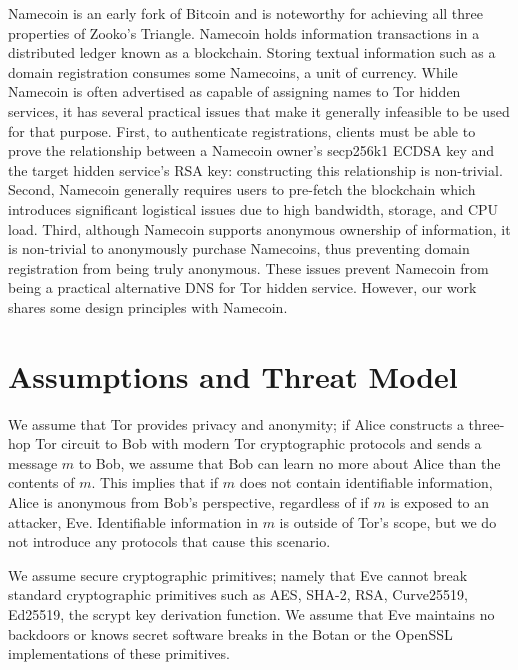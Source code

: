 \documentclass{sig-alternate}
\begin{document}
Namecoin\cite{NamecoinHome} is an early fork of Bitcoin\cite{nakamoto2008bitcoin} and is noteworthy for achieving all three properties of Zooko's Triangle. Namecoin holds information transactions in a distributed ledger known as a blockchain. Storing textual information such as a domain registration consumes some Namecoins, a unit of currency. While Namecoin is often advertised as capable of assigning names to Tor hidden services, it has several practical issues that make it generally infeasible to be used for that purpose. First, to authenticate registrations, clients must be able to prove the relationship between a Namecoin owner's secp256k1 ECDSA key and the target hidden service's RSA key: constructing this relationship is non-trivial. Second, Namecoin generally requires users to pre-fetch the blockchain which introduces significant logistical issues due to high bandwidth, storage, and CPU load. Third, although Namecoin supports anonymous ownership of information, it is non-trivial to anonymously purchase Namecoins, thus preventing domain registration from being truly anonymous. These issues prevent Namecoin from being a practical alternative DNS for Tor hidden service. However, our work shares some design principles with Namecoin.

\section{Assumptions and Threat Model}
\label{sec:threatModel}

We assume that Tor provides privacy and anonymity; if Alice constructs a three-hop Tor circuit to Bob with modern Tor cryptographic protocols and sends a message $ m $ to Bob, we assume that Bob can learn no more about Alice than the contents of $ m $. This implies that if $ m $ does not contain identifiable information, Alice is anonymous from Bob's perspective, regardless of if $ m $ is exposed to an attacker, Eve. Identifiable information in $ m $ is outside of Tor's scope, but we do not introduce any protocols that cause this scenario.

We assume secure cryptographic primitives; namely that Eve cannot break standard cryptographic primitives such as AES, SHA-2, RSA, Curve25519, Ed25519, the scrypt key derivation function. We assume that Eve maintains no backdoors or knows secret software breaks in the Botan or the OpenSSL implementations of these primitives.

\end{document}
